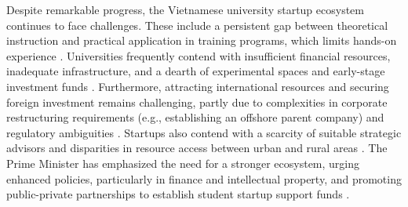 \documentclass[../Main.tex]{subfiles}
\begin{document}
	Despite remarkable progress, the Vietnamese university startup ecosystem continues to face challenges. These include a persistent gap between theoretical instruction and practical application in training programs, which limits hands-on experience \cite{nhandan2025startup}. Universities frequently contend with insufficient financial resources, inadequate infrastructure, and a dearth of experimental spaces and early-stage investment funds \cite{nhandan2025startup}. Furthermore, attracting international resources and securing foreign investment remains challenging, partly due to complexities in corporate restructuring requirements (e.g., establishing an offshore parent company) and regulatory ambiguities \cite{bssc2025wave, nssc2024challenges}. Startups also contend with a scarcity of suitable strategic advisors and disparities in resource access between urban and rural areas \cite{ueh2024vc}. The Prime Minister has emphasized the need for a stronger ecosystem, urging enhanced policies, particularly in finance and intellectual property, and promoting public-private partnerships to establish student startup support funds \cite{vietnamnews2025pm}.
	
\end{document}
